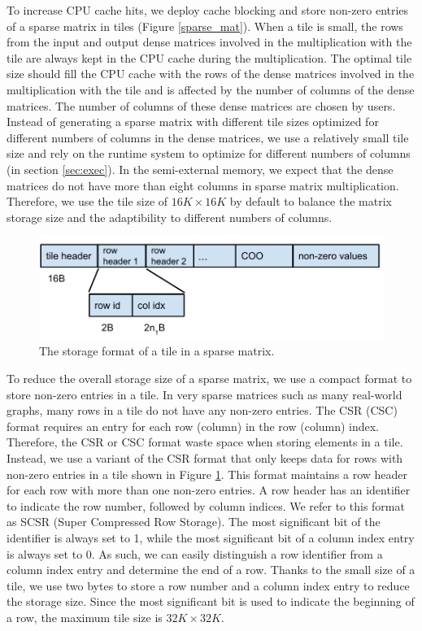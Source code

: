 To increase CPU cache hits, we deploy cache blocking \cite{Im04} and store
non-zero entries of a sparse matrix in tiles (Figure \ref{sparse_mat}).
When a tile is small, the rows from the input and output dense matrices
involved in the multiplication with the tile are always kept in the CPU cache
during the multiplication. The optimal tile size should fill the CPU cache
with the rows of the dense matrices involved in the multiplication with
the tile and is affected by the number of columns of the dense matrices.
The number of columns of these dense matrices are chosen by users. Instead
of generating a sparse matrix with
different tile sizes optimized for different numbers of columns in the dense
matrices, we use a relatively small tile size and rely on the runtime system
to optimize for different numbers of columns (in section \ref{sec:exec}).
In the semi-external memory, we expect that the dense matrices do not
have more than eight columns in sparse matrix multiplication. Therefore, we
use the tile size of $16K \times 16K$ by default to balance the matrix storage
size and the adaptibility to different numbers of columns.

\begin{figure}
\centering
\includegraphics[scale=0.5]{./tile_format.pdf}
\vspace{-5pt}
\caption{The storage format of a tile in a sparse matrix.}
\vspace{-5pt}
\label{tile_format}
\end{figure}

To reduce the overall storage size of a sparse matrix, we use a compact format
to store non-zero entries in a tile. In very sparse matrices such as
many real-world graphs, many rows in a tile do not have any non-zero entries.
The CSR (CSC) format requires an entry for each row (column) in the row
(column) index. Therefore, the CSR or CSC format waste space when storing elements
in a tile. Instead, we use a variant of the CSR format that only keeps data for
rows with non-zero entries in a tile shown in Figure \ref{tile_format}. This
format maintains a row header for each row with more than one non-zero entries.
A row header has an identifier to indicate the row number, followed by column
indices. We refer to this format as SCSR (Super Compressed Row Storage).
The most significant bit of the identifier is always set to 1, while the most
significant bit of a column index entry is always set to 0. As such, we can easily
distinguish a row identifier from a column index entry and determine the end
of a row. Thanks to the small size of a tile, we use two bytes to store a row
number and a column index entry to reduce the storage size. Since the most
significant bit is used to indicate the beginning of a row, the maximum tile size
is $32K \times 32K$.

